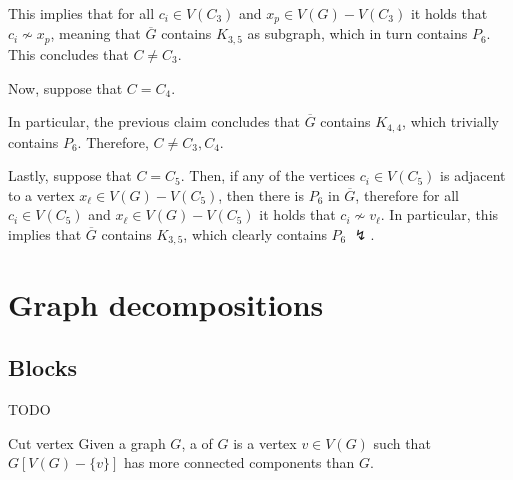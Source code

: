 \documentclass[a4paper, 12pt]{report}
\begin{document}
{        This implies that for all $c_i \in V(C_3)$ and $x_p \in V(G) - V(C_3)$ it holds that $c_i \nsim x_p$, meaning that $\overline G$ contains $K_{3,5}$ as subgraph, which in turn contains $P_6$. This concludes that $C \neq C_3$.

        Now, suppose that $C = C_4$.


        In particular, the previous claim concludes that $\overline G$ contains $K_{4,4}$, which trivially contains $P_6$. Therefore, $C \neq C_3, C_4$.

        Lastly, suppose that $C = C_5$. Then, if any of the vertices $c_i \in V(C_5)$ is adjacent to a vertex $x_\ell \in V(G) - V(C_5)$, then there is $P_6$ in $\overline G$, therefore for all $c_i \in V(C_5)$ and $x_\ell \in V(G) - V(C_5)$ it holds that $c_i \nsim v_\ell$. In particular, this implies that $\overline G$ contains $K_{3,5}$, which clearly contains $P_6$ $\lightning$.
    }

    \chapter{Graph decompositions}

    \section{Blocks}

    TODO 

    \begin{frameddefn}{Cut vertex}
        Given a graph $G$, a  of $G$ is a vertex $v \in V(G)$ such that $G[V(G) - \{v\}]$ has more connected components than $G$.
    \end{frameddefn}
\end{document}
